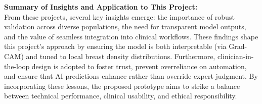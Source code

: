 \documentclass[12pt]{article}
\begin{document}
\noindent \textbf{Summary of Insights and Application to This Project:} \\
From these projects, several key insights emerge: the importance of robust validation across diverse populations, the need for transparent model outputs, and the value of seamless integration into clinical workflows. These findings shape this project’s approach by ensuring the model is both interpretable (via Grad-CAM) and tuned to local breast density distributions. Furthermore, clinician-in-the-loop design is adopted to foster trust, prevent overreliance on automation, and ensure that AI predictions enhance rather than override expert judgment. By incorporating these lessons, the proposed prototype aims to strike a balance between technical performance, clinical usability, and ethical responsibility.




\end{document}
